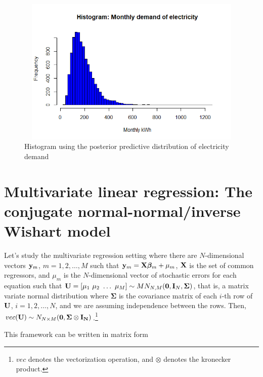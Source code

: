 \begin{figure}[!h]
	\includegraphics[width=340pt, height=200pt]{Chapters/chapter4/figures/PredDemElect.png}
	\caption[List of figure caption goes here]{Histogram using the posterior predictive distribution of electricity demand}\label{fig41}
\end{figure}

 
\section{Multivariate linear regression: The conjugate normal-normal/inverse Wishart model}\label{sec44}

Let's study the multivariate regression setting where there are $N$-dimensional vectors ${\bf{y}}_m$, $m=1,2,\dots,M$ such that ${\bf{y}}_m={\bf{X}}\bm{\beta}_m+\mu_m$, ${\bf{X}}$ is the set of common regressors, and $\mu_m$ is the $N$-dimensional vector of stochastic errors for each equation such that ${\bf{U}}=[\mu_1 \ \mu_2 \ \dots \ \mu_M]\sim MN_{N,M}({\bf{0}}, {\bf{I}}_N, {\bm{\Sigma}})$, that is, a matrix variate normal distribution where $\bm{\Sigma}$ is the covariance matrix of each $i$-th row of ${\bf{U}}$, $i=1,2,\dots,N$, and we are assuming independence between the rows. Then, $vec({\bf U})\sim N_{N\times M}({\bf 0}, \bf{\Sigma}\otimes {\bf{I}}_N)$.\footnote{$vec$ denotes the vectorization operation, and $\otimes$ denotes the kronecker product.}

This framework can be written in matrix form

